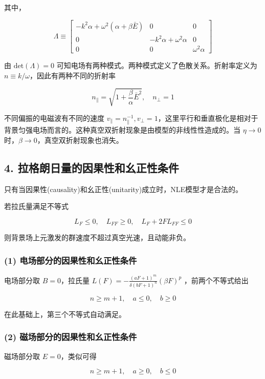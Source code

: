 \documentclass[aps,prl,preprint,groupedaddress]{revtex4-2}
\begin{document}
其中，

$$
\Lambda
\equiv \begin{bmatrix}
-k^2 \alpha+\omega^2\left(\alpha+\beta\bar{E} \right) &0 &0 \\
0 &-k^2\alpha+\omega^2\alpha &0 \\
0 &0 &\omega^2\alpha
\end{bmatrix} 
$$

由 $\mathrm{det}(\Lambda)=0 $ 可知电场有两种模式。两种模式定义了色散关系。折射率定义为 $n\equiv k/\omega $，因此有两种不同的折射率

$$
n_\parallel = \sqrt{1+\frac{\beta }{\alpha } \bar{E}^2},\quad
n_\perp = 1 
$$

不同偏振的电磁波有不同的速度 $v_\parallel=n_\parallel^{-1},v_\perp=1 $，这里平行和垂直极化是相对于背景匀强电场而言的。这种真空双折射现象是由模型的非线性性造成的。当 $\eta\to 0$ 时，$\beta\to 0$，真空双折射现象也消失。

\subsection{4. 拉格朗日量的因果性和幺正性条件}

只有当因果性(causality)和幺正性(unitarity)成立时，NLE模型才是合法的\cite{shabad2011effective}。

若拉氏量满足不等式

$$
L_F \leq 0,\quad
L_{FF}\geq 0,\quad
L_F + 2F L_{FF} \leq 0
$$

则背景场上元激发的群速度不超过真空光速，且动能非负。

\subsubsection{(1) 电场部分的因果性和幺正性条件}

电场部分取 $B=0 $，拉氏量 $\displaystyle{L(F)=-\frac{\left(aF+1 \right)^m }{\delta(bF+1)^n } \left(\beta F \right)^p }$ ，前两个不等式给出

$$
n\geq m+1,\quad a\leq 0,\quad b\geq 0
$$

在此基础上，第三个不等式自动满足。

\subsubsection{(2) 磁场部分的因果性和幺正性条件}

磁场部分取 $E=0 $，类似可得

$$
n\geq m+1,\quad a\geq 0,\quad b\leq 0
$$
\end{document}

